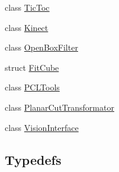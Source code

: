 \begin{DoxyCompactItemize}
\item 
class \hyperlink{classkukadu_1_1TicToc}{Tic\-Toc}
\item 
class \hyperlink{classkukadu_1_1Kinect}{Kinect}
\item 
class \hyperlink{classkukadu_1_1OpenBoxFilter}{Open\-Box\-Filter}
\item 
struct \hyperlink{structkukadu_1_1FitCube}{Fit\-Cube}
\item 
class \hyperlink{classkukadu_1_1PCLTools}{P\-C\-L\-Tools}
\item 
class \hyperlink{classkukadu_1_1PlanarCutTransformator}{Planar\-Cut\-Transformator}
\item 
class \hyperlink{classkukadu_1_1VisionInterface}{Vision\-Interface}
\end{DoxyCompactItemize}
\subsection*{Typedefs}
